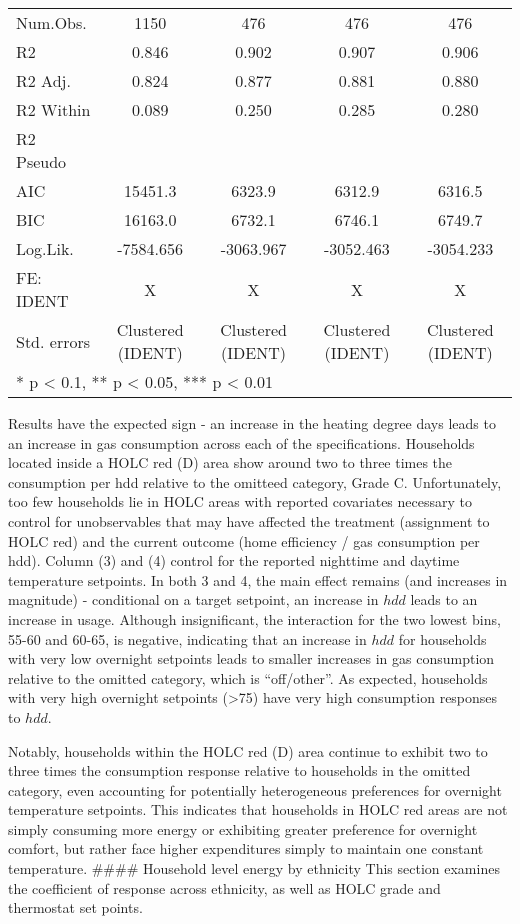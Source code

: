 \documentclass[
]{article}
\begin{document}
\begin{table}[H]
\begin{tabular}[t]{lcccc}
\midrule
Num.Obs. & 1150 & 476 & 476 & 476\\
R2 & 0.846 & 0.902 & 0.907 & 0.906\\
R2 Adj. & 0.824 & 0.877 & 0.881 & 0.880\\
R2 Within & 0.089 & 0.250 & 0.285 & 0.280\\
R2 Pseudo &  &  &  & \\
AIC & 15451.3 & 6323.9 & 6312.9 & 6316.5\\
BIC & 16163.0 & 6732.1 & 6746.1 & 6749.7\\
Log.Lik. & -7584.656 & -3063.967 & -3052.463 & -3054.233\\
FE: IDENT & X & X & X & X\\
Std. errors & Clustered (IDENT) & Clustered (IDENT) & Clustered (IDENT) & Clustered (IDENT)\\
\bottomrule
\multicolumn{5}{l}{\textsuperscript{} * p < 0.1, ** p < 0.05, *** p < 0.01}\\
\end{tabular}
\end{table}

Results have the expected sign - an increase in the heating degree days
leads to an increase in gas consumption across each of the
specifications. Households located inside a HOLC red (D) area show
around two to three times the consumption per hdd relative to the
omitteed category, Grade C. Unfortunately, too few households lie in
HOLC areas with reported covariates necessary to control for
unobservables that may have affected the treatment (assignment to HOLC
red) and the current outcome (home efficiency / gas consumption per
hdd). Column (3) and (4) control for the reported nighttime and daytime
temperature setpoints. In both 3 and 4, the main effect remains (and
increases in magnitude) - conditional on a target setpoint, an increase
in \(hdd\) leads to an increase in usage. Although insignificant, the
interaction for the two lowest bins, 55-60 and 60-65, is negative,
indicating that an increase in \(hdd\) for households with very low
overnight setpoints leads to smaller increases in gas consumption
relative to the omitted category, which is ``off/other''. As expected,
households with very high overnight setpoints (\textgreater75) have very
high consumption responses to \(hdd\).

Notably, households within the HOLC red (D) area continue to exhibit two
to three times the consumption response relative to households in the
omitted category, even accounting for potentially heterogeneous
preferences for overnight temperature setpoints. This indicates that
households in HOLC red areas are not simply consuming more energy or
exhibiting greater preference for overnight comfort, but rather face
higher expenditures simply to maintain one constant temperature.
\#\#\#\# Household level energy by ethnicity This section examines the
coefficient of response across ethnicity, as well as HOLC grade and
thermostat set points.
\end{document}
